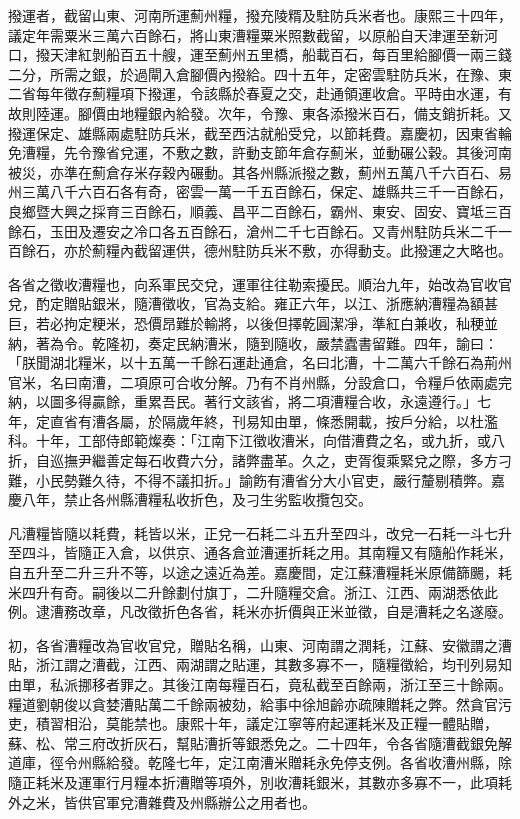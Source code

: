 \begin{pinyinscope}
撥運者，截留山東、河南所運薊州糧，撥充陵糈及駐防兵米者也。康熙三十四年，議定年需粟米三萬六百餘石，將山東漕糧粟米照數截留，以原船自天津運至新河口，撥天津紅剝船百五十艘，運至薊州五里橋，船載百石，每百里給腳價一兩三錢二分，所需之銀，於過閘入倉腳價內撥給。四十五年，定密雲駐防兵米，在豫、東二省每年徵存薊糧項下撥運，令該縣於春夏之交，赴通領運收倉。平時由水運，有故則陸運。腳價由地糧銀內給發。次年，令豫、東各添撥米百石，備支銷折耗。又撥運保定、雄縣兩處駐防兵米，截至西沽就船受兌，以節耗費。嘉慶初，因東省輪免漕糧，先令豫省兌運，不敷之數，許動支節年倉存薊米，並動碾公穀。其後河南被災，亦準在薊倉存米存穀內碾動。其各州縣派撥之數，薊州五萬八千六百石、易州三萬八千六百石各有奇，密雲一萬一千五百餘石，保定、雄縣共三千一百餘石，良鄉暨大興之採育三百餘石，順義、昌平二百餘石，霸州、東安、固安、寶坻三百餘石，玉田及遷安之冷口各五百餘石，滄州二千七百餘石。又青州駐防兵米二千一百餘石，亦於薊糧內截留運供，德州駐防兵米不敷，亦得動支。此撥運之大略也。

各省之徵收漕糧也，向系軍民交兌，運軍往往勒索擾民。順治九年，始改為官收官兌，酌定贈貼銀米，隨漕徵收，官為支給。雍正六年，以江、浙應納漕糧為額甚巨，若必拘定粳米，恐價昂難於輸將，以後但擇乾圓潔凈，準紅白兼收，秈稉並納，著為令。乾隆初，奏定民納漕米，隨到隨收，嚴禁蠹書留難。四年，諭曰：「朕聞湖北糧米，以十五萬一千餘石運赴通倉，名曰北漕，十二萬六千餘石為荊州官米，名曰南漕，二項原可合收分解。乃有不肖州縣，分設倉口，令糧戶依兩處完納，以圖多得贏餘，重累吾民。著行文該省，將二項漕糧合收，永遠遵行。」七年，定直省有漕各屬，於隔歲年終，刊易知由單，條悉開載，按戶分給，以杜濫科。十年，工部侍郎範燦奏：「江南下江徵收漕米，向借漕費之名，或九折，或八折，自巡撫尹繼善定每石收費六分，諸弊盡革。久之，吏胥復乘緊兌之際，多方刁難，小民勢難久待，不得不議扣折。」諭飭有漕省分大小官吏，嚴行釐剔積弊。嘉慶八年，禁止各州縣漕糧私收折色，及刁生劣監收攬包交。

凡漕糧皆隨以耗費，耗皆以米，正兌一石耗二斗五升至四斗，改兌一石耗一斗七升至四斗，皆隨正入倉，以供京、通各倉並漕運折耗之用。其南糧又有隨船作耗米，自五升至二升三升不等，以途之遠近為差。嘉慶間，定江蘇漕糧耗米原備篩颺，耗米四升有奇。嗣後以二升餘劃付旗丁，二升隨糧交倉。浙江、江西、兩湖悉依此例。逮漕務改章，凡改徵折色各省，耗米亦折價與正米並徵，自是漕耗之名遂廢。

初，各省漕糧改為官收官兌，贈貼名稱，山東、河南謂之潤耗，江蘇、安徽謂之漕貼，浙江謂之漕截，江西、兩湖謂之貼運，其數多寡不一，隨糧徵給，均刊列易知由單，私派挪移者罪之。其後江南每糧百石，竟私截至百餘兩，浙江至三十餘兩。糧道劉朝俊以貪婪漕貼萬二千餘兩被劾，給事中徐旭齡亦疏陳贈耗之弊。然貪官污吏，積習相沿，莫能禁也。康熙十年，議定江寧等府起運耗米及正糧一體貼贈，蘇、松、常三府改折灰石，幫貼漕折等銀悉免之。二十四年，令各省隨漕截銀免解道庫，徑令州縣給發。乾隆七年，定江南漕米贈耗永免停支例。各省收漕州縣，除隨正耗米及運軍行月糧本折漕贈等項外，別收漕耗銀米，其數亦多寡不一，此項耗外之米，皆供官軍兌漕雜費及州縣辦公之用者也。


\end{pinyinscope}
